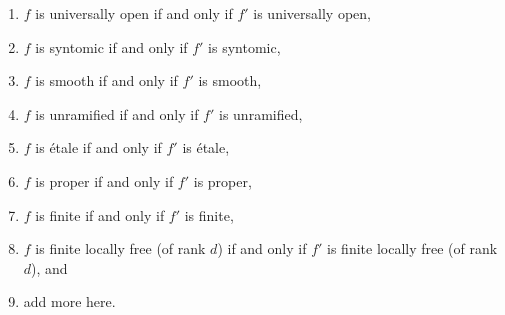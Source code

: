 \begin{lemma}
\begin{enumerate}
$f'$ is locally of finite type of relative dimension $d$,
\item $f$ is universally open if and only if $f'$ is universally open,
\label{item-universally-open-fp-over-ft}
\item $f$ is syntomic if and only if $f'$ is syntomic,
\label{item-syntomic-fp-over-ft}
\item $f$ is smooth if and only if $f'$ is smooth,
\label{item-smooth-fp-over-ft}
\item $f$ is unramified if and only if $f'$ is unramified,
\label{item-unramified-fp-over-ft}
\item $f$ is \'etale if and only if $f'$ is \'etale,
\label{item-etale-fp-over-ft}
\item $f$ is proper if and only if $f'$ is proper,
\label{item-proper-fp-over-ft}
\item $f$ is finite if and only if $f'$ is finite,
\label{item-finite-fp-over-ft}
\item
\label{item-finite-locally-free-fp-over-ft}
$f$ is finite locally free (of rank $d$) if and only if $f'$
is finite locally free (of rank $d$), and
\item add more here.
\end{enumerate}
\end{lemma}

